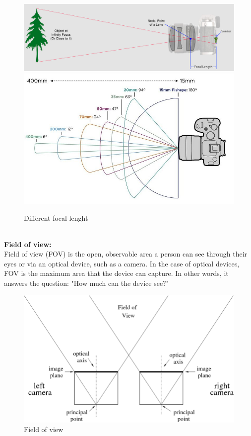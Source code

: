 \documentclass[22pt]{report}
\begin{document}
        \begin{figure}[h]
            \centering
            \includegraphics[width=0.5\linewidth]{Images/FocalLenght.jpg} 
            \includegraphics[width=0.5\linewidth]{Images/FocalLenghtOfCamera.jpg}
            \caption{Different focal lenght}
        \end{figure}\\
        \textbf{Field of view:}\\
        Field of view (FOV) is the open, observable area a person can see through their eyes or via an optical device, such as a camera. In the case of optical devices, FOV is the maximum area that the device can capture. In other words, it answers the question: "How much can the device see?"
        \begin{figure}[h]
            \centering
            \includegraphics[width=0.5\linewidth]{Images/FieldOfView.png}
            \caption{Field of view}
            \label{fig:enter-label}
        \end{figure}
            
    
\end{document}
